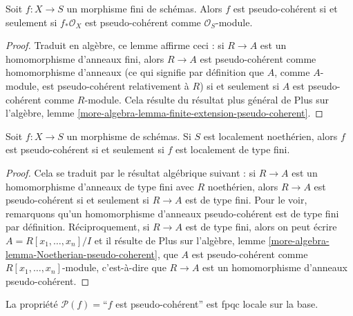 \begin{lemma}
\label{lemma-finite-pseudo-coherent}
Soit $f : X \to S$ un morphisme fini de schémas.
Alors $f$ est pseudo-cohérent si et seulement si $f_*\mathcal{O}_X$
est pseudo-cohérent comme $\mathcal{O}_S$-module.
\end{lemma}

\begin{proof}
Traduit en algèbre, ce lemme affirme ceci : si $R \to A$
est un homomorphisme d'anneaux fini, alors $R \to A$ est pseudo-cohérent comme homomorphisme d'anneaux
(ce qui signifie par définition que $A$, comme $A$-module, est
pseudo-cohérent relativement à $R$) si et seulement si
$A$ est pseudo-cohérent comme $R$-module. Cela résulte du résultat
plus général de
Plus sur l'algèbre, lemme
\ref{more-algebra-lemma-finite-extension-pseudo-coherent}.
\end{proof}

\begin{lemma}
\label{lemma-Noetherian-pseudo-coherent}
Soit $f : X \to S$ un morphisme de schémas.
Si $S$ est localement noethérien, alors $f$ est pseudo-cohérent si
et seulement si $f$ est localement de type fini.
\end{lemma}

\begin{proof}
Cela se traduit par le résultat algébrique suivant :
si $R \to A$ est un homomorphisme d'anneaux de type fini avec $R$ noethérien, alors
$R \to A$ est pseudo-cohérent si et seulement si $R \to A$ est de type fini.
Pour le voir, remarquons qu'un homomorphisme d'anneaux pseudo-cohérent est de type fini par
définition. Réciproquement, si $R \to A$ est de type fini, alors
on peut écrire $A = R[x_1, \ldots, x_n]/I$ et il résulte de
Plus sur l'algèbre,
lemme \ref{more-algebra-lemma-Noetherian-pseudo-coherent},
que $A$ est pseudo-cohérent comme $R[x_1, \ldots, x_n]$-module, c'est-à-dire que
$R \to A$ est un homomorphisme d'anneaux pseudo-cohérent.
\end{proof}

\begin{lemma}
\label{lemma-descending-property-pseudo-coherent}
La propriété $\mathcal{P}(f) =$``$f$ est pseudo-cohérent''
est fpqc locale sur la base.
\end{lemma}

